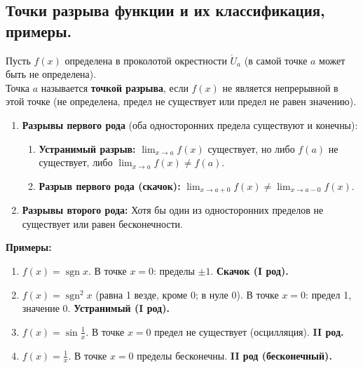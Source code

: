 \subsection{Точки разрыва функции и их классификация, примеры.}

Пусть $f(x)$ определена в проколотой окрестности $\mathring{U}_a$ (в самой точке $a$ может быть не определена). \\
Точка $a$ называется \textbf{точкой разрыва}, если $f(x)$ не является непрерывной в этой точке (не определена, предел не существует или предел не равен значению).

\begin{enumerate}
	\item \textbf{Разрывы первого рода} (оба односторонних предела существуют и конечны):
	\begin{enumerate}
		\item \textbf{Устранимый разрыв:} $\lim_{x\to a} f(x)$ существует, но либо $f(a)$ не существует, либо $\lim_{x\to a} f(x) \neq f(a)$.
		\item \textbf{Разрыв первого рода (скачок):} $\lim_{x\to a+0} f(x) \neq \lim_{x\to a-0} f(x)$.
	\end{enumerate}

	\item \textbf{Разрывы второго рода:}
		Хотя бы один из односторонних пределов не существует или равен бесконечности.
\end{enumerate}

\textbf{Примеры:}
\begin{enumerate}
	\item $f(x) = \operatorname{sgn} x$. В точке $x=0$: пределы $\pm 1$. \textbf{Скачок (I род).}
	\item $f(x) = \operatorname{sgn}^2 x$ (равна 1 везде, кроме 0; в нуле 0). В точке $x=0$: предел 1, значение 0. \textbf{Устранимый (I род).}
	\item $f(x) = \sin \frac{1}{x}$. В точке $x=0$ предел не существует (осцилляция). \textbf{II род.}
	\item $f(x) = \frac{1}{x}$. В точке $x=0$ пределы бесконечны. \textbf{II род (бесконечный).}
\end{enumerate}

